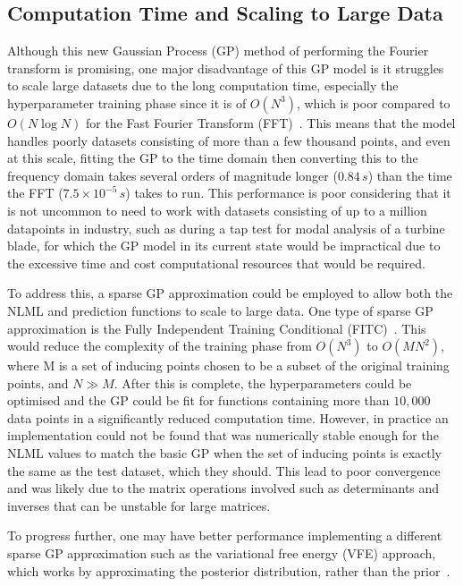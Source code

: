 \documentclass[12pt]{article}
\begin{document}
    \subsection{Computation Time and Scaling to Large Data}
    Although this new Gaussian Process (GP) method of performing the Fourier transform is promising, one major disadvantage of this GP model is it struggles to scale large datasets due to the long computation time, especially the hyperparameter training phase since it is of $O(N^3)$, which is poor compared to $O(N \log{N})$ for the Fast Fourier Transform (FFT)~\cite{murphy2023probabilistic}.
    This means that the model handles poorly datasets consisting of more than a few thousand points, and even at this scale, fitting the GP to the time domain then converting this to the frequency domain takes several orders of magnitude longer ($0.84 \, s$) than the time the FFT ($7.5 \times 10^{-5} \, s$) takes to run.
    This performance is poor considering that it is not uncommon to need to work with datasets consisting of up to a million datapoints in industry, such as during a tap test for modal analysis of a turbine blade, for which the GP model in its current state would be impractical due to the excessive time and cost computational resources that would be required.

    To address this, a sparse GP approximation could be employed to allow both the NLML and prediction functions to scale to large data.
    One type of sparse GP approximation is the Fully Independent Training Conditional (FITC)~\cite{q-candela}.
    This would reduce the complexity of the training phase from $O(N^3)$ to $O(MN^2)$, where M is a set of inducing points chosen to be a subset of the original training points, and $N \gg M$. 
    After this is complete, the hyperparameters could be optimised and the GP could be fit for functions containing more than $10,000$ data points in a significantly reduced computation time.
    However, in practice an implementation could not be found that was numerically stable enough for the NLML values to match the basic GP when the set of inducing points is exactly the same as the test dataset, which they should.
    This lead to poor convergence and was likely due to the matrix operations involved such as determinants and inverses that can be unstable for large matrices.

    To progress further, one may have better performance implementing a different sparse GP approximation such as the variational free energy (VFE) approach, which works by approximating the posterior distribution, rather than the prior~\cite{murphy2023probabilistic}.
\end{document}
